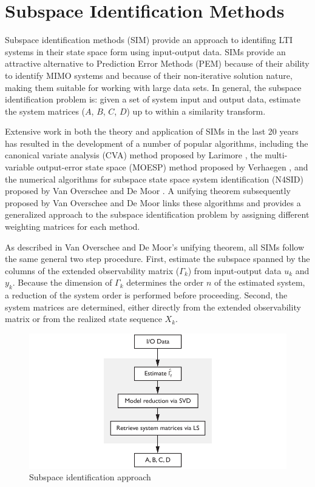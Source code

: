 \chapter{Subspace Identification Methods}
Subspace identification methods (SIM) provide an approach to identifing LTI systems in their state space form using input-output data. SIMs provide an attractive alternative to Prediction Error Methods (PEM) because of their ability to identify MIMO systems and because of their non-iterative solution nature, making them suitable for working with large data sets. In general, the subspace identification problem is: given a set of system input and output data, estimate the system matrices ($A$, $B$, $C$, $D$) up to within a similarity transform. 

Extensive work in both the theory and application of SIMs in the last 20 years has resulted in the development of a number of popular algorithms, including the canonical variate analysis (CVA) method proposed by Larimore \cite{larimore1990canonical}, the multi-variable output-error state space (MOESP) method proposed by Verhaegen \cite{verhaegen1992subspace}, and the numerical algorithms for subspace state space system identification (N4SID) proposed by Van Overschee and De Moor \cite{van1994n4sid}. A unifying theorem subsequently proposed by Van Overschee and De Moor \cite{van1995unifying} links these algorithms and provides a generalized approach to the subspace identification problem by assigning different weighting matrices for each method.

As described in Van Overschee and De Moor's unifying theorem, all SIMs follow the same general two step procedure. First, estimate the subspace spanned by the columns of the extended observability matrix ($\Gamma_k$) from input-output data $u_k$ and $y_k$. Because the dimension of $\Gamma_k$ determines the order $n$ of the estimated system, a reduction of the system order is performed before proceeding. Second, the system matrices are determined, either directly from the extended observability matrix or from the realized state sequence $X_k$.
\begin{figure}[htb!]
	\centering
	\includegraphics{../fig/sim_flow_diagram.pdf}
	\caption{Subspace identification approach}
\end{figure}

